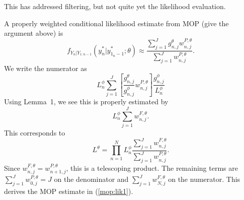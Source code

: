 \documentclass[12p]{article}
\begin{document}
This has addressed filtering, but not quite yet the likelihood evaluation.

A properly weighted conditional likelihood estimate from MOP (give the argument above) is
\[
f_{Y_n|Y_{1:n-1}}(y_n^*|y_{1_n-1}^*;\theta) \approx \frac{\sum_{j=1}^Jg^\theta_{n,j} w^{P,\theta}_{n,j}}{\sum_{j=1}^J  w^{P,\theta}_{n,j}}.
\]
We write the numerator as
\[
L^\phi_n \sum_{j=1}^J \left[ \frac{g^\theta_{n,j}}{g^\phi_{n,j}} w^{P,\theta}_{n,j}\right] \frac{g^\phi_{n,j}}{L_n^\phi}
\]
Using Lemma~1, we see this is properly estimated by
\[
L^\phi_n \sum_{j=1}^J w^{F,\theta}_{n,j}.
\]
This corresponds to
\[
L^\theta = \prod_{n=1}^N L^\phi_n \frac{\sum_{j=1}^J w^{F,\theta}_{n,j}}{\sum_{j=1}^J w^{P,\theta}_{n,j}}.
\]
Since $w^{F,\theta}_{n,j}=w^{P,\theta}_{n+1,j}$, this is a telescoping product. The remaining terms are
$\sum_{j=1}^J w^{P,\theta}_{0,j} = J$ on the denominator and $\sum_{j=1}^J w^{F,\theta}_{N,j}$ on the numerator.
This derives the MOP estimate in (\ref{mop:lik1}).
\end{document}

